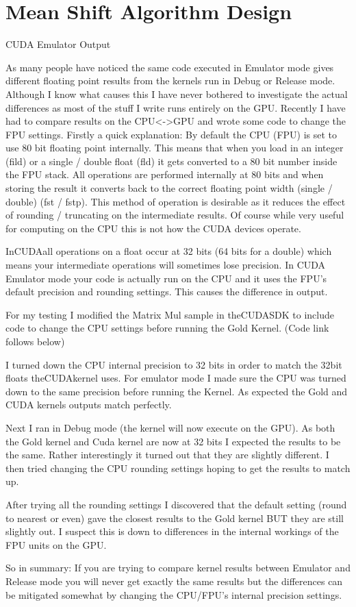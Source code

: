 \chapter{Mean Shift Algorithm Design} %
\label{cha:algorithm_design}


CUDA Emulator Output

As many people have noticed the same code executed in Emulator mode gives
different floating point results from the kernels run in Debug or Release mode.
Although I know what causes this I have never bothered to investigate the actual
differences as most of the stuff I write runs entirely on the GPU. Recently I
have had to compare results on the CPU<->GPU and wrote some code to change the
FPU settings. Firstly a quick explanation: By default the CPU (FPU) is set to
use 80 bit floating point internally. This means that when you load in an
integer (fild) or a single / double float (fld) it gets converted to a 80 bit
number inside the FPU stack. All operations are performed internally at 80 bits
and when storing the result it converts back to the correct floating point width
(single / double) (fst / fstp). This method of operation is desirable as it
reduces the effect of rounding / truncating on the intermediate results. Of
course while very useful for computing on the CPU this is not how the CUDA
devices operate.

 In\gls{CUDA}all operations on a float occur at 32 bits (64 bits for a double) which
means your intermediate operations will sometimes lose precision. In CUDA
Emulator mode your code is actually run on the CPU and it uses the FPU’s default
precision and rounding settings. This causes the difference in output.

 For my testing I modified the Matrix Mul sample in the\gls{CUDA}SDK to include code
to change the CPU settings before running the Gold Kernel. (Code link follows
below)

 I turned down the CPU internal precision to 32 bits in order to match the 32bit
floats the\gls{CUDA}kernel uses. For emulator mode I made sure the CPU was turned
down to the same precision before running the Kernel. As expected the Gold and
CUDA kernels outputs match perfectly.

 Next I ran in Debug mode (the kernel will now execute on the GPU). As both the
Gold kernel and Cuda kernel are now at 32 bits I expected the results to be the
same. Rather interestingly it turned out that they are slightly different. I
then tried changing the CPU rounding settings hoping to get the results to match
up.

 After trying all the rounding settings I discovered that the default setting
(round to nearest or even) gave the closest results to the Gold kernel BUT they
are still slightly out. I suspect this is down to differences in the internal
workings of the FPU units on the GPU.

 So in summary: If you are trying to compare kernel results between Emulator and
Release mode you will never get exactly the same results but the differences can
be mitigated somewhat by changing the CPU/FPU’s internal precision settings.
